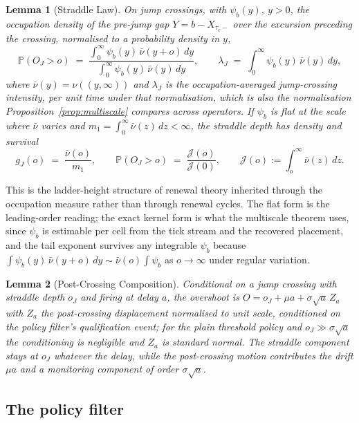 \documentclass[11pt,a4paper]{article}
\theoremstyle{definition}
\theoremstyle{plain}
\newtheorem{lemma}{Lemma}
\theoremstyle{remark}
\newcommand{\jtail}{\mathcal{J}}
\begin{document}
\begin{lemma}[Straddle Law]\label{lem:straddle}
On jump crossings, with $\psi_b(y)$, $y > 0$, the occupation density of the pre-jump gap $Y = b - X_{\tau_c-}$ over the excursion preceding the crossing, normalised to a probability density in $y$,
\[
\mathbb{P}(O_J > o) \;=\;
\frac{\int_0^\infty \psi_b(y)\, \bar\nu(y + o)\, dy}
{\int_0^\infty \psi_b(y)\, \bar\nu(y)\, dy},
\qquad
\lambda_J \;=\; \int_0^\infty \psi_b(y)\, \bar\nu(y)\, dy,
\]
where $\bar\nu(y) = \nu((y, \infty))$ and $\lambda_J$ is the occupation-averaged jump-crossing intensity, per unit time under that normalisation, which is also the normalisation
Proposition~\ref{prop:multiscale} compares across operators. If $\psi_b$ is flat at the scale where $\bar\nu$ varies and $m_1 = \int_0^\infty
\bar\nu(z)\, dz < \infty$, the straddle depth has density and survival
\[
g_J(o) \;=\; \frac{\bar\nu(o)}{m_1}, \qquad
\mathbb{P}(O_J > o) \;=\; \frac{\jtail(o)}{\jtail(0)}, \qquad
\jtail(o) := \int_o^\infty \bar\nu(z)\, dz .
\]
\end{lemma}

This is the ladder-height structure of renewal theory\cite{asmussen2003} inherited through the occupation measure rather than through renewal cycles. The flat form is the
leading-order reading; the exact kernel form is what the multiscale theorem uses, since $\psi_b$ is estimable per cell from the tick stream and the recovered placement, and the tail exponent survives
any integrable $\psi_b$ because $\int \psi_b(y)\, \bar\nu(y + o)\,dy \sim \bar\nu(o) \int \psi_b$ as $o \to \infty$ under regular variation.

\begin{lemma}[Post-Crossing Composition]\label{lem:composition}
Conditional on a jump crossing with straddle depth $o_J$ and firing at delay $a$, the overshoot is $O = o_J + \mu a + \sigma\sqrt{a}\,
Z_a$ with $Z_a$ the post-crossing displacement normalised to unit scale, conditioned on the policy filter's qualification event; for the plain threshold policy and $o_J \gg \sigma\sqrt{a}$ the
conditioning is negligible and $Z_a$ is standard normal. The straddle component stays at $o_J$ whatever the delay, while the post-crossing motion contributes the drift $\mu a$ and a monitoring component 
of order $\sigma\sqrt{a}$.
\end{lemma}

\subsection{The policy filter}\label{sec:policy}
\end{document}
